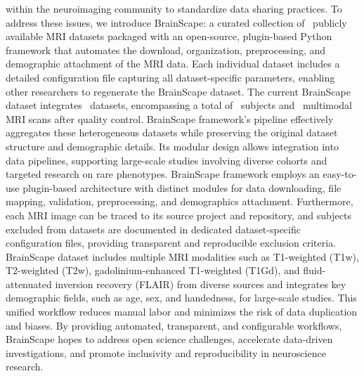 within the neuroimaging community to standardize data sharing practices. 
To address these issues, we introduce BrainScape: a curated collection of \NumDatasets\ publicly available MRI datasets 
packaged with an open-source, plugin-based Python framework that automates the download, organization, preprocessing, and demographic attachment of the MRI data. 
Each individual dataset includes a detailed configuration file capturing all dataset-specific parameters, 
enabling other researchers to regenerate the BrainScape dataset. 
The current BrainScape dataset integrates \NumDatasets\ datasets,
encompassing a total of \TotalSubjectsIncludedAfterInspectionCount\ subjects and \TotalNumMRIs\ multimodal MRI scans after quality control. 
BrainScape framework's pipeline effectively aggregates these heterogeneous datasets while preserving the original dataset structure and demographic details.
Its modular design allows integration into data pipelines, supporting large-scale studies involving diverse cohorts and targeted research on rare phenotypes. 
BrainScape framework employs an easy-to-use plugin-based architecture with distinct modules for data downloading, file mapping, validation, preprocessing, and demographics attachment. 
Furthermore, each MRI image can be traced to its source project and repository, and subjects excluded from datasets are documented in dedicated dataset-specific configuration files, 
providing transparent and reproducible exclusion criteria.
BrainScape dataset includes multiple MRI modalities such as T1-weighted (T1w), T2-weighted (T2w), 
gadolinium-enhanced T1-weighted (T1Gd), and fluid-attenuated inversion recovery (FLAIR) from diverse sources 
and integrates key demographic fields, such as age, sex, and handedness, for large-scale studies.
This unified workflow reduces manual labor and minimizes the risk of data duplication and biases. 
By providing automated, transparent, and configurable workflows, 
BrainScape hopes to address open science challenges, accelerate data-driven investigations, 
and promote inclusivity and reproducibility in neuroscience research. 
